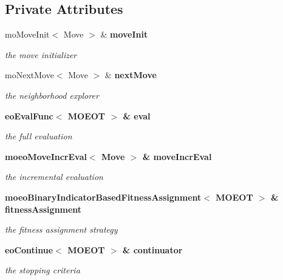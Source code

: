 \subsection*{Private Attributes}
\begin{CompactItemize}
\item 
mo\-Move\-Init$<$ Move $>$ \& \bf{move\-Init}\label{classmoeoIBMOLS_b4b4908b893edd52d6fa24085d2a89e5}

\begin{CompactList}\small\item\em the move initializer \item\end{CompactList}\item 
mo\-Next\-Move$<$ Move $>$ \& \bf{next\-Move}\label{classmoeoIBMOLS_8b8ebbd6eb6c82caa796160b4be2a86b}

\begin{CompactList}\small\item\em the neighborhood explorer \item\end{CompactList}\item 
\bf{eo\-Eval\-Func}$<$ MOEOT $>$ \& \bf{eval}\label{classmoeoIBMOLS_e9acda4b2f61f8960109a8c6fd52551e}

\begin{CompactList}\small\item\em the full evaluation \item\end{CompactList}\item 
\bf{moeo\-Move\-Incr\-Eval}$<$ Move $>$ \& \bf{move\-Incr\-Eval}\label{classmoeoIBMOLS_6c38636061bd03c4be809277e2dc257a}

\begin{CompactList}\small\item\em the incremental evaluation \item\end{CompactList}\item 
\bf{moeo\-Binary\-Indicator\-Based\-Fitness\-Assignment}$<$ MOEOT $>$ \& \bf{fitness\-Assignment}\label{classmoeoIBMOLS_0c858da33922736b74d9875766cec9d7}

\begin{CompactList}\small\item\em the fitness assignment strategy \item\end{CompactList}\item 
\bf{eo\-Continue}$<$ MOEOT $>$ \& \bf{continuator}\label{classmoeoIBMOLS_c15985c0bb5d9ba835f35d99d7c42b14}

\begin{CompactList}\small\item\em the stopping criteria \item\end{CompactList}\end{CompactItemize}
